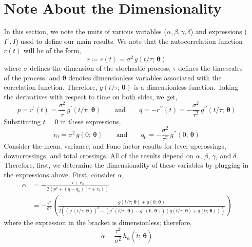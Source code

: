 \documentclass[journal]{IEEEtran}
\theoremstyle{plain}
\theoremstyle{definition}
\theoremstyle{remark}
\newcommand{\Iup}{I^\uparrow}
\newcommand{\btheta}{\boldsymbol{\theta}}
\begin{document}
\section{Note About the Dimensionality}
In this section, we note the units of various variables ($\alpha, \beta, \gamma, \delta$) and expressions ($\Iup, I$) used to define our main results. 
We note that the autocorrelation function $r(t)$ will be of the form,
\begin{equation}
    r \coloneq r(t) = \sigma^2 \, g\left(t/\tau;\,\btheta\right)
\end{equation}
where $\sigma$ defines the dimension of the stochastic process, $\tau$ defines the timescales of the process, and $\btheta$ denotes dimensionless variables associated with the correlation function. Therefore, $g\left(t/\tau;\,\btheta\right)$ is a dimensionless function. Taking the derivatives with respect to time on both sides, we get,
\begin{equation}
    p = r^\prime(t) = \frac{\sigma^2}{\tau} \, g^\prime\left(t/\tau;\,\btheta\right) \qquad \text{and} \qquad q = -r^{\prime\prime}(t) = -\frac{\sigma^2}{\tau^2} \, g^{\prime\prime}\left(t/\tau;\,\btheta\right)
\end{equation}
Substituting $t=0$ in these expressions, 
\begin{equation}
    r_0 = \sigma^2 \, g\left(0;\,\btheta\right) \qquad \text{and} \qquad q_0 = -\frac{\sigma^2}{\tau^2} \, g^{\prime\prime}\left(0;\,\btheta\right)
\end{equation}
Consider the mean, variance, and Fano factor results for level upcrossings, downcrossings, and total crossings. All of the results depend on $\alpha$, $\beta$, $\gamma$, and $\delta$. Therefore, first, we determine the dimensionality of these variables by plugging in the expressions above. First, consider $\alpha$,
\begin{equation}
\begin{split}
    \alpha &= -\frac{r+r_0}{2\left(p^2+(q-q_0)(r+r_0)\right)} \\
    &= - \frac{\tau^2}{\sigma^2}\left(\frac{g\left(t/\tau;\,\btheta\right) + g\left(0;\,\btheta\right)}{2\left((g^\prime\left(t/\tau;\,\btheta\right))^2 - (g^{\prime\prime}\left(t/\tau;\,\btheta\right)-g^{\prime\prime}\left(0;\,\btheta\right))(g\left(t/\tau;\,\btheta\right)+g\left(0;\,\btheta\right))\right)}\right)
\end{split}
\end{equation}
where the expression in the bracket is dimensionless; therefore,
\begin{equation}
    \alpha = \frac{\tau^2}{\sigma^2} \, h_\alpha\left(\tilde{t}; \, \btheta\right)
\end{equation}
\end{document}
